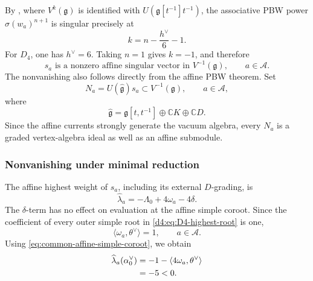 \documentclass[11pt,reqno]{amsart}
\theoremstyle{definition}
\theoremstyle{remark}
\begin{document}
By \cite[Section~4 and Theorem~4.2(1)(b)]{ArakawaMoreau2018}, where
\(V^k(\mathfrak g)\) is identified with
\(U(\mathfrak g[t^{-1}]t^{-1})\), the associative PBW power
\(\sigma(w_a)^{n+1}\) is singular precisely at
\begin{equation*}
  k=n-\frac{h^\vee}{6}-1.
\end{equation*}
For \(D_4\), one has \(h^\vee=6\).  Taking \(n=1\) gives \(k=-1\), and
therefore
\begin{equation*}
  s_a\text{ is a nonzero affine singular vector in }
  V^{-1}(\mathfrak g),
  \qquad a\in\mathcal A.
\end{equation*}
The nonvanishing also follows directly from the affine PBW theorem.  Set
\begin{equation*}
  N_a=U(\widehat{\mathfrak g})s_a
  \subset V^{-1}(\mathfrak g),
  \qquad a\in\mathcal A,
\end{equation*}
where
\begin{equation*}
  \widehat{\mathfrak g}
  =\mathfrak g[t,t^{-1}]\oplus\mathbb CK\oplus\mathbb CD.
\end{equation*}
Since the affine currents strongly generate the vacuum algebra, every
\(N_a\) is a graded vertex-algebra ideal as well as an affine submodule.

\subsubsection{Nonvanishing under minimal reduction}


The affine highest weight of \(s_a\), including its external
\(D\)-grading, is
\begin{equation*}
  \widehat\lambda_a
  =-\Lambda_0+4\omega_a-4\delta.
\end{equation*}
The \(\delta\)-term has no effect on evaluation at the affine simple
coroot.  Since the coefficient of every outer simple root in
\eqref{d4:eq:D4-highest-root} is one,
\begin{equation}
  \langle\omega_a,\theta^\vee\rangle=1,
  \qquad a\in\mathcal A.
  \label{d4:eq:D4-outer-weight-highest-coroot-pairing}
\end{equation}
Using \eqref{eq:common-affine-simple-coroot}, we obtain
\begin{align}
  \widehat\lambda_a(\alpha_0^\vee)
  &=-1-\langle4\omega_a,\theta^\vee\rangle
    \notag\\
  &=-5<0.
  \label{d4:eq:D4-singular-highest-weight-negative-wall}
\end{align}
\end{document}
